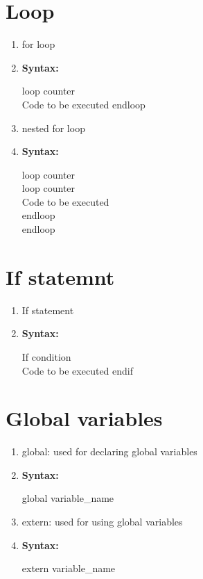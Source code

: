 \documentclass{scrreprt}
\begin{document}
\section{Loop}
\begin{enumerate}
\item for loop
\item[] \textbf{Syntax:}\\
\begin{center}
loop counter\\
Code to be executed
endloop\\
\end{center}

\item nested for loop
\item[] \textbf{Syntax:}\\
\begin{center}
loop counter\\
loop counter\\
Code to be executed\\
endloop\\
endloop\\
\end{center}
\end{enumerate}

\section{If statemnt}
\begin{enumerate}
\item If statement
\item[] \textbf{Syntax:}\\
\begin{center}
If condition\\
Code to be executed
endif\\
\end{center}
\end{enumerate}

\section{Global variables}
\begin{enumerate}
\item global: used for declaring global variables
\item[] \textbf{Syntax:}\\
\begin{center}
global variable_name
\end{center}

\item extern: used for using global variables
\item[] \textbf{Syntax:}\\
\begin{center}
extern variable_name
\end{center}
\end{enumerate}
\end{document}
